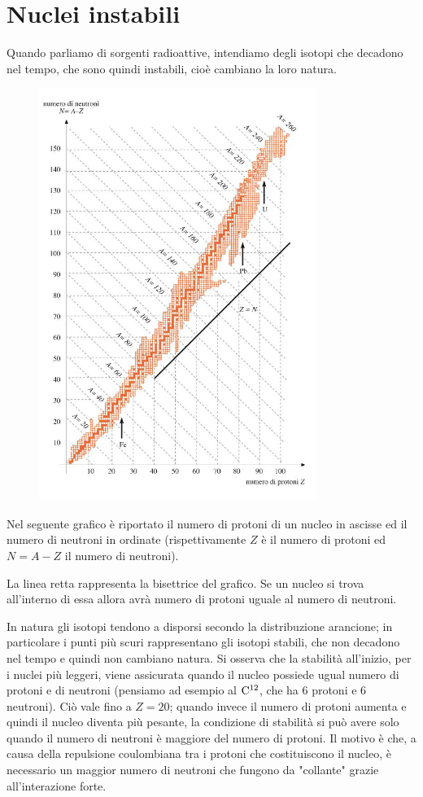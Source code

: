 \section{Nuclei instabili}

Quando parliamo di sorgenti radioattive, intendiamo degli isotopi che decadono nel tempo, che sono quindi instabili, cioè cambiano la loro natura.

\begin{figure}[H]
    \centering
    \includegraphics[width=9cm]{immagini/carta_di_segre.png}
\end{figure}

Nel seguente grafico è riportato il numero di protoni di un nucleo in ascisse ed il numero di neutroni in ordinate (rispettivamente $Z$ è il numero di protoni ed $N=A-Z$ il numero di neutroni).

La linea retta rappresenta la bisettrice del grafico. Se un nucleo si trova all'interno di essa allora avrà numero di protoni uguale al numero di neutroni.

In natura gli isotopi tendono a disporsi secondo la distribuzione arancione; in particolare i punti più scuri rappresentano gli isotopi stabili, che non decadono nel tempo e quindi non cambiano natura. Si osserva che la stabilità all'inizio, per i nuclei più leggeri, viene assicurata quando il nucleo possiede ugual numero di protoni e di neutroni (pensiamo ad esempio al $\rm C^{12}$, che ha 6 protoni e 6 neutroni). Ciò vale fino a $Z=20$; quando invece il numero di protoni aumenta e quindi il nucleo diventa più pesante, la condizione di stabilità si può avere solo quando il numero di neutroni è maggiore del numero di protoni. Il motivo è che, a causa della repulsione coulombiana tra i protoni che costituiscono il nucleo, è necessario un maggior numero di neutroni che fungono da "collante" grazie all'interazione forte.

